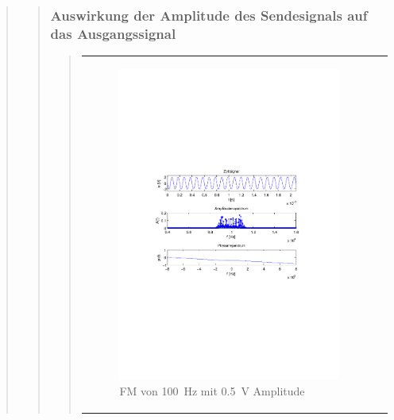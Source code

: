 \begin{quote}
\begin{quote}
\begin{quote}
            
        \end{quote}
        
        \subsubsection{Auswirkung der Amplitude des Sendesignals auf das Ausgangssignal}
        \begin{quote}
            
            \begin{center}
            \begin{tabular}{ll}
            
            \hspace{-5cm}
                \begin{minipage}{0.6\textwidth}
                    \begin{figure}[H]
                        \includegraphics[scale=0.7, trim = 35mm 100mm 35mm 95mm, clip]{Bilder/f100_05}
                        \caption{FM von \SI{100}{\hertz} mit \SI{0,5}{\volt} Amplitude}
                        \label{fig:f100_05}
                    \end{figure}
                \end{minipage}
                

\end{tabular}
\end{center}
\end{quote}
\end{quote}
\end{quote}
